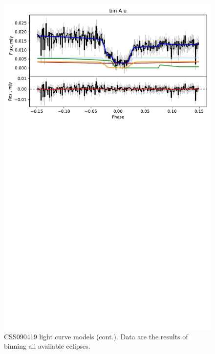 \begin{figure}
    \centering
    \includegraphics[width=\textwidth, trim={0cm 17cm 0cm 0cm}, clip]{figures/results/CSS090419/CSS090419_2.pdf}
    \caption{CSS090419 light curve models (cont.). Data are the results of binning all available eclipses.}
    \label{fig:CSS090419 all light curves cont 1}
\end{figure}
